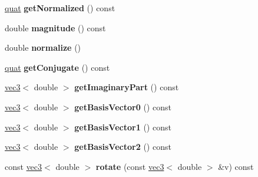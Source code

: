 \begin{DoxyCompactItemize}
\item 
\hypertarget{classmath_1_1quat_acd8a29ba111f64abdcdad425516375bc}{
\hyperlink{classmath_1_1quat}{quat} {\bfseries getNormalized} () const }
\label{classmath_1_1quat_acd8a29ba111f64abdcdad425516375bc}

\item 
\hypertarget{classmath_1_1quat_a70506b324aff1df7164d0c41189efc98}{
double {\bfseries magnitude} () const }
\label{classmath_1_1quat_a70506b324aff1df7164d0c41189efc98}

\item 
\hypertarget{classmath_1_1quat_a7cffb626dac428532625923ea4e278ec}{
double {\bfseries normalize} ()}
\label{classmath_1_1quat_a7cffb626dac428532625923ea4e278ec}

\item 
\hypertarget{classmath_1_1quat_abd47aa399cfcc2498d18f4358b9b9cd5}{
\hyperlink{classmath_1_1quat}{quat} {\bfseries getConjugate} () const }
\label{classmath_1_1quat_abd47aa399cfcc2498d18f4358b9b9cd5}

\item 
\hypertarget{classmath_1_1quat_a5a11490065a921ca4d2afa562ba74094}{
\hyperlink{classmath_1_1vec3}{vec3}$<$ double $>$ {\bfseries getImaginaryPart} () const }
\label{classmath_1_1quat_a5a11490065a921ca4d2afa562ba74094}

\item 
\hypertarget{classmath_1_1quat_a5998124ba92c68161992c53a465ef6b2}{
\hyperlink{classmath_1_1vec3}{vec3}$<$ double $>$ {\bfseries getBasisVector0} () const }
\label{classmath_1_1quat_a5998124ba92c68161992c53a465ef6b2}

\item 
\hypertarget{classmath_1_1quat_ac6f43651196f13664ad7dfbb0c10b9db}{
\hyperlink{classmath_1_1vec3}{vec3}$<$ double $>$ {\bfseries getBasisVector1} () const }
\label{classmath_1_1quat_ac6f43651196f13664ad7dfbb0c10b9db}

\item 
\hypertarget{classmath_1_1quat_a03654b382e157ea5cd3760627cdb4aa8}{
\hyperlink{classmath_1_1vec3}{vec3}$<$ double $>$ {\bfseries getBasisVector2} () const }
\label{classmath_1_1quat_a03654b382e157ea5cd3760627cdb4aa8}

\item 
\hypertarget{classmath_1_1quat_ab7ffef38f419abe685da3aaed60955df}{
const \hyperlink{classmath_1_1vec3}{vec3}$<$ double $>$ {\bfseries rotate} (const \hyperlink{classmath_1_1vec3}{vec3}$<$ double $>$ \&v) const }
\label{classmath_1_1quat_ab7ffef38f419abe685da3aaed60955df}


\end{DoxyCompactItemize}
